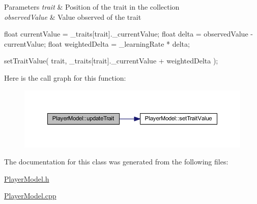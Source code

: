 \begin{DoxyParams}{Parameters}
{\em trait} & Position of the trait in the collection \\
\hline
{\em observedValue} & Value observed of the trait \\
\hline
\end{DoxyParams}

\begin{DoxyCode}
{
        float currentValue = _traits[trait]._currentValue;
        float delta = observedValue - currentValue;
        float weightedDelta = _learningRate * delta;

        setTraitValue( trait, _traits[trait]._currentValue + weightedDelta );
}
\end{DoxyCode}


Here is the call graph for this function:
\nopagebreak
\begin{figure}[H]
\begin{center}
\leavevmode
\includegraphics[width=376pt]{de/d93/class_player_model_a4ad3b83f22c1befc44d7d92b5f1ca743_cgraph}
\end{center}
\end{figure}




The documentation for this class was generated from the following files:\begin{DoxyCompactItemize}
\item 
\hyperlink{_player_model_8h}{PlayerModel.h}\item 
\hyperlink{_player_model_8cpp}{PlayerModel.cpp}\end{DoxyCompactItemize}
